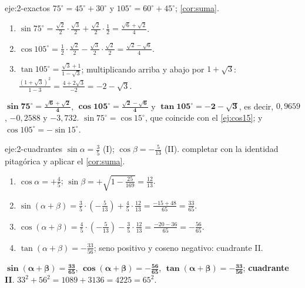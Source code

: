 \begin{solucion}{eje:2-exactos}
\planteamiento $75^{\circ}=45^{\circ}+30^{\circ}$ y $105^{\circ}=60^{\circ}+45^{\circ}$; \cref{cor:suma}.
\pasos
\begin{enumerate}[label=\arabic*.]
  \item $\sin75^{\circ}=\frac{\sqrt2}{2}\cdot\frac{\sqrt3}{2}+\frac{\sqrt2}{2}\cdot\frac12=\frac{\sqrt6+\sqrt2}{4}$.
  \item $\cos105^{\circ}=\frac12\cdot\frac{\sqrt2}{2}-\frac{\sqrt3}{2}\cdot\frac{\sqrt2}{2}=\frac{\sqrt2-\sqrt6}{4}$.
  \item $\tan105^{\circ}=\frac{\sqrt3+1}{1-\sqrt3}$; multiplicando arriba y abajo por $1+\sqrt3$: $\frac{(1+\sqrt3)^{2}}{1-3}=\frac{4+2\sqrt3}{-2}=-2-\sqrt3$.
\end{enumerate}
\resultado $\mathbf{\sin75^{\circ}=\frac{\sqrt6+\sqrt2}{4}}$, $\mathbf{\cos105^{\circ}=\frac{\sqrt2-\sqrt6}{4}}$ y $\mathbf{\tan105^{\circ}=-2-\sqrt3}$, es decir, $0{,}9659$, $-0{,}2588$ y $-3{,}732$.
\comprobacion $\sin75^{\circ}=\cos15^{\circ}$, que coincide con el \cref{ej:cos15}; y $\cos105^{\circ}=-\sin15^{\circ}$.
\end{solucion}

\begin{solucion}{eje:2-cuadrantes}
\datos $\sin\alpha=\frac35$ (I); $\cos\beta=-\frac{5}{13}$ (II).
\planteamiento completar con la identidad pitagórica y aplicar el \cref{cor:suma}.
\pasos
\begin{enumerate}[label=\arabic*.]
  \item $\cos\alpha=+\frac45$; $\sin\beta=+\sqrt{1-\frac{25}{169}}=\frac{12}{13}$.
  \item $\sin(\alpha+\beta)=\frac35\cdot(-\frac{5}{13})+\frac45\cdot\frac{12}{13}=\frac{-15+48}{65}=\frac{33}{65}$.
  \item $\cos(\alpha+\beta)=\frac45\cdot(-\frac{5}{13})-\frac35\cdot\frac{12}{13}=\frac{-20-36}{65}=-\frac{56}{65}$.
  \item $\tan(\alpha+\beta)=-\frac{33}{56}$; seno positivo y coseno negativo: cuadrante II.
\end{enumerate}
\resultado $\mathbf{\sin(\alpha+\beta)=\frac{33}{65}}$, $\mathbf{\cos(\alpha+\beta)=-\frac{56}{65}}$, $\mathbf{\tan(\alpha+\beta)=-\frac{33}{56}}$; \textbf{cuadrante II}.
\comprobacion $33^{2}+56^{2}=1089+3136=4225=65^{2}$.
\end{solucion}

